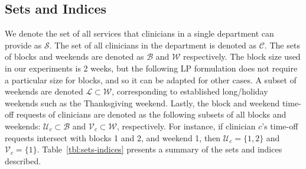 \subsection{Sets and Indices}\label{sec:meth-sets-indices}
We denote the set of all services %
that clinicians in a single department can provide as $\mathcal{S}$. 
The set of all clinicians in the department is denoted as
$\mathcal{C}$. The sets of blocks and weekends
are denoted as $\mathcal{B}$ and $\mathcal{W}$ respectively. The block size
used in our experiments is 2 weeks, but the following LP formulation does not
require a particular size for blocks, and so it can be adapted for other cases.
A subset of weekends are denoted $\mathcal{L} \subset \mathcal{W}$, corresponding to established
long/holiday weekends such as the Thanksgiving weekend. Lastly,
the block and weekend time-off requests of clinicians are denoted as the following
subsets of all blocks and weekends: $\mathcal{U}_c \subset \mathcal{B}$ and $\mathcal{V}_c \subset \mathcal{W}$, respectively.
For instance, if clinician $c$'s time-off requests intersect with blocks 1 and 2, and weekend
1, then $\mathcal{U}_c = \{1, 2\}$ and $\mathcal{V}_c = \{1\}$. Table~\ref{tbl:sets-indices} presents a summary of the sets and indices described. 


